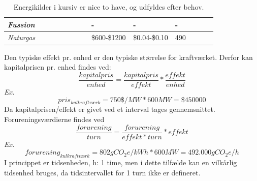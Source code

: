\documentclass[a4paper,12pt]{report}
\begin{document}
\begin{table}[H]
\begin{tabular}{|p{0.2\linewidth}|p{0.2\linewidth}|p{0.2\linewidth}|p{0.2\linewidth}|p{0.2\linewidth}|}
\textit{Fussion}              &                                       & -                                         & -                                                                                    & -                                       \\ \hline
\textit{Naturgas}             &                                       & \$600-\$1200                                & \$0.04-\$0.10                                                                          & 490                                     \\ \hline
\end{tabular}
\label{tab:energityper}
\caption{Energikilder i kursiv er nice to have, og udfyldes efter behov.}
\end{table}

Den typiske effekt pr. enhed er den typiske størrelse for kraftværket. Derfor kan kapitalprisen pr. enhed findes ved:
\begin{equation}
\frac{kapital pris}{enhed}=\frac{kapital pris}{effekt}*\frac{effekt}{enhed}
\end{equation}
\textit{Ex.}
\begin{equation}
pris_{kulkraftværk}=750\$/MW*600MW=\$450000
\end{equation}
Da kapitalprisen/effekt er givet ved et interval tages gennemsnittet.\\
Forureningsværdierne findes ved
\begin{equation}
\frac{forurening}{turn}=\frac{forurening}{effekt*turn}*effekt
\end{equation}
\textit{Ex.}
\begin{equation}
forurening_{kulkraftværk}=802 gCO_2e/kWh*600MW=492.000 gCO_2e/h
\end{equation}
I princippet er tidsenheden, h: 1 time, men i dette tilfælde kan en vilkårlig tidsenhed bruges, da tidsintervallet for 1 turn ikke er defineret.
\end{document}
